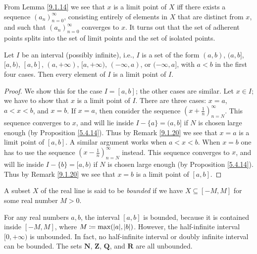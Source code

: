 \setcounter{theorem}{19}
\begin{remark}\label{9.1.20}
    From Lemma \ref{9.1.14} we see that \(x\) is a limit point of \(X\) iff there exists a sequence \((a_n)_{n = 0}^\infty\), consisting entirely of elements in \(X\) that are distinct from \(x\), and such that \((a_n)_{n = 0}^\infty\) converges to \(x\).
    It turns out that the set of adherent points splits into the set of limit points and the set of isolated points.
\end{remark}

\begin{lemma}\label{9.1.21}
    Let \(I\) be an interval (possibly infinite), i.e., \(I\) is a set of the form \((a, b)\), \((a, b]\), \([a, b)\), \([a, b]\), \((a, +\infty)\), \([a, +\infty)\), \((-\infty, a)\), or \((-\infty, a]\), with \(a < b\) in the first four cases.
    Then every element of \(I\) is a limit point of \(I\).
\end{lemma}

\begin{proof}
    We show this for the case \(I = [a, b]\);
    the other cases are similar.
    Let \(x \in I\);
    we have to show that \(x\) is a limit point of \(I\).
    There are three cases: \(x = a\), \(a < x < b\), and \(x = b\).
    If \(x = a\), then consider the sequence \((x + \frac{1}{n})_{n = N}^\infty\).
    This sequence converges to \(x\), and will lie inside \(I - \{a\} = (a, b]\) if \(N\) is chosen large enough (by Proposition \ref{5.4.14}).
    Thus by Remark \ref{9.1.20} we see that \(x = a\) is a limit point of \([a, b]\).
    A similar argument works when \(a < x < b\).
    When \(x = b\) one has to use the sequence \((x - \frac{1}{n})_{n = N}^\infty\) instead.
    This sequence converges to \(x\), and will lie inside \(I - \{b\} = [a, b)\) if \(N\) is chosen large enough (by Proposition \ref{5.4.14}).
    Thus by Remark \ref{9.1.20} we see that \(x = b\) is a limit point of \([a, b]\).
\end{proof}

\begin{definition}\label{9.1.22}
    A subset \(X\) of the real line is said to be \emph{bounded} if we have \(X \subseteq [-M, M]\) for some real number \(M > 0\).
\end{definition}

\begin{example}\label{9.1.23}
    For any real numbers \(a, b\), the interval \([a, b]\) is bounded, because it is contained inside \([-M, M]\), where \(M \coloneqq \max(\abs*{a}, \abs*{b})\).
    However, the half-infinite interval \([0, +\infty)\) is unbounded.
    In fact, no half-infinite interval or doubly infinite interval can be bounded.
    The sets \(\mathbf{N}\), \(\mathbf{Z}\), \(\mathbf{Q}\), and \(\mathbf{R}\) are all unbounded.
\end{example}

